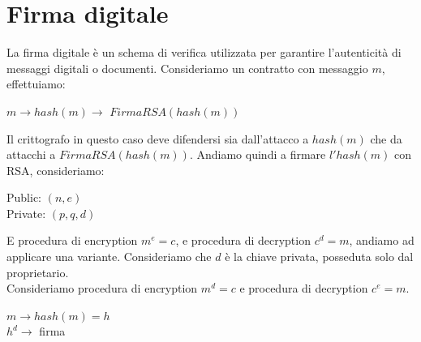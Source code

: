 \documentclass[11pt, oneside]{article}   	%
\begin{document}
\section*{Firma digitale}
La firma digitale è un schema di verifica utilizzata per garantire l'autenticità di messaggi digitali o documenti. Consideriamo un contratto con messaggio $m$, effettuiamo:
\begin{center}
$m \rightarrow hash(m) \rightarrow$ $Firma RSA(hash(m))$
\end{center}
Il crittografo in questo caso deve difendersi sia dall'attacco a $hash(m)$ che da attacchi a $Firma RSA(hash(m))$. Andiamo quindi a firmare $l'hash(m)$ con RSA, consideriamo:
\begin{center}
Public: $(n,e)$\\
Private: $(p, q, d)$
\end{center}
E procedura di encryption $m^e = c$, e procedura di decryption $c^d = m$, andiamo ad applicare una variante. Consideriamo che $d$ è la chiave privata, posseduta solo dal proprietario.\\
Consideriamo procedura di encryption $m^d = c$ e procedura di decryption $c^e = m$.
\begin{center}
$m \rightarrow hash(m) = h$\\
$h^d \rightarrow$ firma
\end{center}

\long{}
\end{document}
